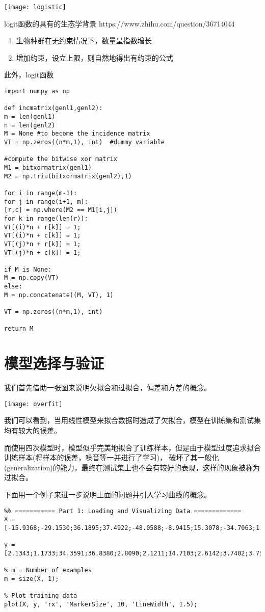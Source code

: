 \texttt{[image: logistic]}


logit函数的具有的生态学背景
https://www.zhihu.com/question/36714044

\begin{enumerate}
	\item 生物种群在无约束情况下，数量呈指数增长
	\item 增加约束，设立上限，则自然地得出有约束的公式
\end{enumerate}
此外，logit函数


\begin{verbatim}
import numpy as np

def incmatrix(genl1,genl2):
m = len(genl1)
n = len(genl2)
M = None #to become the incidence matrix
VT = np.zeros((n*m,1), int)  #dummy variable

#compute the bitwise xor matrix
M1 = bitxormatrix(genl1)
M2 = np.triu(bitxormatrix(genl2),1) 

for i in range(m-1):
for j in range(i+1, m):
[r,c] = np.where(M2 == M1[i,j])
for k in range(len(r)):
VT[(i)*n + r[k]] = 1;
VT[(i)*n + c[k]] = 1;
VT[(j)*n + r[k]] = 1;
VT[(j)*n + c[k]] = 1;

if M is None:
M = np.copy(VT)
else:
M = np.concatenate((M, VT), 1)

VT = np.zeros((n*m,1), int)

return M
\end{verbatim}


\section{模型选择与验证}

我们首先借助一张图来说明欠拟合和过拟合，偏差和方差的概念。

\texttt{[image: overfit]}

我们可以看到，当用线性模型来拟合数据时造成了欠拟合，模型在训练集和测试集均有较大的误差。

而使用四次模型时，模型似乎完美地拟合了训练样本，但是由于模型过度追求拟合训练样本(将样本的误差，噪音等一并进行了学习)，
破坏了其一般化(generalization)的能力，最终在测试集上也不会有较好的表现，这样的现象被称为过拟合。

下面用一个例子来进一步说明上面的问题并引入学习曲线的概念。

\begin{verbatim}
%% =========== Part 1: Loading and Visualizing Data =============
X =  [-15.9368;-29.1530;36.1895;37.4922;-48.0588;-8.9415;15.3078;-34.7063;1.3892;-44.3838;7.0135;22.7627]

y = [2.1343;1.1733;34.3591;36.8380;2.8090;2.1211;14.7103;2.6142;3.7402;3.7317;7.6277;22.7524]

% m = Number of examples
m = size(X, 1);

% Plot training data
plot(X, y, 'rx', 'MarkerSize', 10, 'LineWidth', 1.5);

\end{verbatim}

